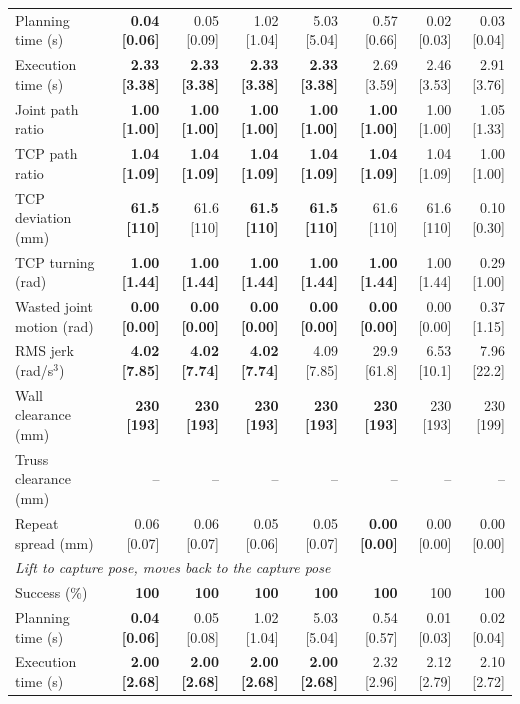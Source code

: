 \begin{table}[t]
\begin{tabular}{lrrrrrrr}
Planning time (s) & \textbf{0.04 [0.06]} & 0.05 [0.09] & 1.02 [1.04] & 5.03 [5.04] & 0.57 [0.66] & 0.02 [0.03] & 0.03 [0.04] \\
Execution time (s) & \textbf{2.33 [3.38]} & \textbf{2.33 [3.38]} & \textbf{2.33 [3.38]} & \textbf{2.33 [3.38]} & 2.69 [3.59] & 2.46 [3.53] & 2.91 [3.76] \\
Joint path ratio & \textbf{1.00 [1.00]} & \textbf{1.00 [1.00]} & \textbf{1.00 [1.00]} & \textbf{1.00 [1.00]} & \textbf{1.00 [1.00]} & 1.00 [1.00] & 1.05 [1.33] \\
TCP path ratio & \textbf{1.04 [1.09]} & \textbf{1.04 [1.09]} & \textbf{1.04 [1.09]} & \textbf{1.04 [1.09]} & \textbf{1.04 [1.09]} & 1.04 [1.09] & 1.00 [1.00] \\
TCP deviation (mm) & \textbf{61.5 [110]} & 61.6 [110] & \textbf{61.5 [110]} & \textbf{61.5 [110]} & 61.6 [110] & 61.6 [110] & 0.10 [0.30] \\
TCP turning (rad) & \textbf{1.00 [1.44]} & \textbf{1.00 [1.44]} & \textbf{1.00 [1.44]} & \textbf{1.00 [1.44]} & \textbf{1.00 [1.44]} & 1.00 [1.44] & 0.29 [1.00] \\
Wasted joint motion (rad) & \textbf{0.00 [0.00]} & \textbf{0.00 [0.00]} & \textbf{0.00 [0.00]} & \textbf{0.00 [0.00]} & \textbf{0.00 [0.00]} & 0.00 [0.00] & 0.37 [1.15] \\
RMS jerk (rad/s$^3$) & \textbf{4.02 [7.85]} & \textbf{4.02 [7.74]} & \textbf{4.02 [7.74]} & 4.09 [7.85] & 29.9 [61.8] & 6.53 [10.1] & 7.96 [22.2] \\
Wall clearance (mm) & \textbf{230 [193]} & \textbf{230 [193]} & \textbf{230 [193]} & \textbf{230 [193]} & \textbf{230 [193]} & 230 [193] & 230 [199] \\
Truss clearance (mm) & -- & -- & -- & -- & -- & -- & -- \\
Repeat spread (mm) & 0.06 [0.07] & 0.06 [0.07] & 0.05 [0.06] & 0.05 [0.07] & \textbf{0.00 [0.00]} & 0.00 [0.00] & 0.00 [0.00] \\
\midrule
\multicolumn{8}{l}{\emph{Lift to capture pose, moves back to the capture pose}} \\
Success (\%) & \textbf{100} & \textbf{100} & \textbf{100} & \textbf{100} & \textbf{100} & 100 & 100 \\
Planning time (s) & \textbf{0.04 [0.06]} & 0.05 [0.08] & 1.02 [1.04] & 5.03 [5.04] & 0.54 [0.57] & 0.01 [0.03] & 0.02 [0.04] \\
Execution time (s) & \textbf{2.00 [2.68]} & \textbf{2.00 [2.68]} & \textbf{2.00 [2.68]} & \textbf{2.00 [2.68]} & 2.32 [2.96] & 2.12 [2.79] & 2.10 [2.72] \\

\end{tabular}
\end{table}
